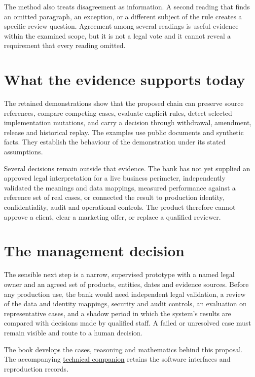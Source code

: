 \documentclass[12pt,a4paper,oneside,openany]{book}
\begin{document}
The method also treats disagreement as information. A second reading that finds
an omitted paragraph, an exception, or a different subject of the rule creates a
specific review question. Agreement among several readings is useful evidence
within the examined scope, but it is not a legal vote and it cannot reveal a
requirement that every reading omitted.

\section*{What the evidence supports today}

The retained demonstrations show that the proposed chain can preserve source
references, compare competing cases, evaluate explicit rules, detect selected
implementation mutations, and carry a decision through withdrawal, amendment,
release and historical replay. The examples use public documents and synthetic
facts. They establish the behaviour of the demonstration under its stated
assumptions.

Several decisions remain outside that evidence. The bank has not yet supplied
an approved legal interpretation for a live business perimeter, independently
validated the meanings and data mappings, measured performance against a
reference set of real cases, or connected the result to production identity,
confidentiality, audit and operational controls. The product therefore cannot
approve a client, clear a marketing offer, or replace a qualified reviewer.

\section*{The management decision}

The sensible next step is a narrow, supervised prototype with a named legal
owner and an agreed set of products, entities, dates and evidence sources. Before
any production use, the bank would need independent legal validation, a review
of the data and identity mappings, security and audit controls, an evaluation on
representative cases, and a shadow period in which the system's results are
compared with decisions made by qualified staff. A failed or unresolved case
must remain visible and route to a human decision.

The book develops the cases, reasoning and mathematics behind this proposal.
The accompanying \href{technical-companion.pdf}{technical companion} retains the
software interfaces and reproduction records.
\tableofcontents
\mainmatter
\end{document}
